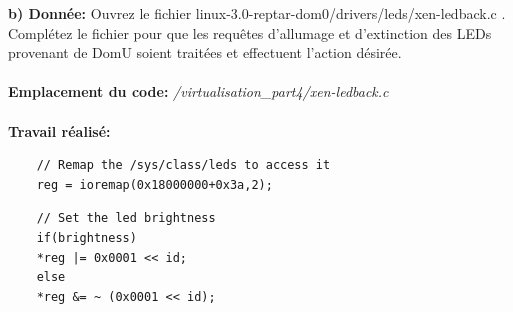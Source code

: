 \textbf{b) Donnée: }Ouvrez le fichier linux-3.0-reptar-dom0/drivers/leds/xen-ledback.c . Complétez le fichier pour que
les requêtes d’allumage et d’extinction des LEDs provenant de DomU soient traitées et effectuent
l’action désirée.\\\\
\textbf{Emplacement du code: }\textit{/virtualisation\_part4/xen-ledback.c}\\\\
\textbf{Travail réalisé: }
\begin{lstlisting}
	// Remap the /sys/class/leds to access it
	reg = ioremap(0x18000000+0x3a,2);
\end{lstlisting}

\begin{lstlisting}
	// Set the led brightness
	if(brightness)
	*reg |= 0x0001 << id;
	else
	*reg &= ~ (0x0001 << id);
\end{lstlisting}

